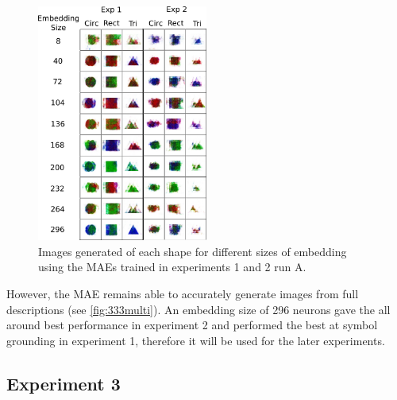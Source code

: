 \begin{figure}[h]
\centering
\includegraphics[width=0.5\textwidth]{Figs/shapes/shapes331v333.png}
\caption{Images generated of each shape for different sizes of embedding using the \acp{MAE} trained in experiments 1 and 2 run A.}
\label{fig:shapes333v331}
\end{figure} %
However, the \ac{MAE} remains able to accurately generate images from full descriptions (see \autoref{fig:333multi}). 
An embedding size of 296 neurons gave the all around best performance in experiment 2 and performed the best at symbol grounding in experiment 1, therefore it will be used for the later experiments.

\newpage
\subsection{Experiment 3}


